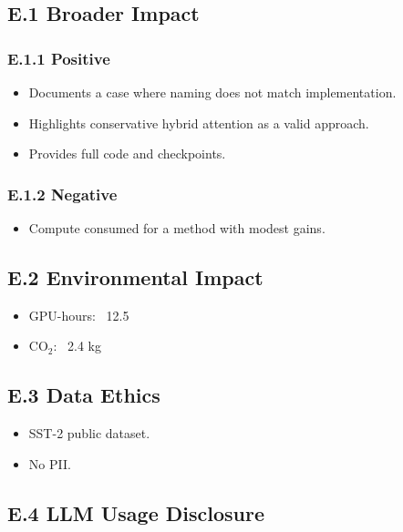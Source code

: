 \subsection{E.1 Broader Impact}

\subsubsection{E.1.1 Positive}

\begin{itemize}
\item Documents a case where naming does not match implementation.
\item Highlights conservative hybrid attention as a valid approach.
\item Provides full code and checkpoints.

\end{itemize}
\subsubsection{E.1.2 Negative}

\begin{itemize}
\item Compute consumed for a method with modest gains.

\end{itemize}
\subsection{E.2 Environmental Impact}

\begin{itemize}
\item GPU-hours: ~12.5
\item CO$_2$: ~2.4 kg

\end{itemize}
\subsection{E.3 Data Ethics}

\begin{itemize}
\item SST-2 public dataset.
\item No PII.

\end{itemize}
\subsection{E.4 LLM Usage Disclosure}

